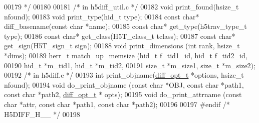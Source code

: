 \begin{DoxyCode}
00179 \textcolor{comment}{ */}
00180 
00181 \textcolor{comment}{/* in h5diff\_util.c */}
00182 \textcolor{keywordtype}{void}        print\_found(hsize\_t nfound);
00183 \textcolor{keywordtype}{void}        print\_type(hid\_t type);
00184 \textcolor{keyword}{const} \textcolor{keywordtype}{char}* diff\_basename(\textcolor{keyword}{const} \textcolor{keywordtype}{char} *name);
00185 \textcolor{keyword}{const} \textcolor{keywordtype}{char}* get\_type(h5trav\_type\_t type);
00186 \textcolor{keyword}{const} \textcolor{keywordtype}{char}* get\_class(H5T\_class\_t tclass);
00187 \textcolor{keyword}{const} \textcolor{keywordtype}{char}* get\_sign(H5T\_sign\_t sign);
00188 \textcolor{keywordtype}{void}        print\_dimensions (\textcolor{keywordtype}{int} rank, hsize\_t *dims);
00189 herr\_t      match\_up\_memsize (hid\_t f\_tid1\_id, hid\_t f\_tid2\_id,
00190                               hid\_t *m\_tid1, hid\_t *m\_tid2, 
00191                               \textcolor{keywordtype}{size\_t} *m\_size1, \textcolor{keywordtype}{size\_t}  *m\_size2);
00192 \textcolor{comment}{/* in h5diff.c */}
00193 \textcolor{keywordtype}{int}         print\_objname(\hyperlink{structdiff__opt__t}{diff\_opt\_t} *options, hsize\_t nfound);
00194 \textcolor{keywordtype}{void}        do\_print\_objname (\textcolor{keyword}{const} \textcolor{keywordtype}{char} *OBJ, \textcolor{keyword}{const} \textcolor{keywordtype}{char} *path1, \textcolor{keyword}{const} \textcolor{keywordtype}{char} *path2, 
      \hyperlink{structdiff__opt__t}{diff\_opt\_t} * opts);
00195 \textcolor{keywordtype}{void}        do\_print\_attrname (\textcolor{keyword}{const} \textcolor{keywordtype}{char} *attr, \textcolor{keyword}{const} \textcolor{keywordtype}{char} *path1, \textcolor{keyword}{const} \textcolor{keywordtype}{char} *path2);
00196 
00197 \textcolor{preprocessor}{#endif  }\textcolor{comment}{/* H5DIFF\_H\_\_ */}\textcolor{preprocessor}{}
00198 
\end{DoxyCode}
